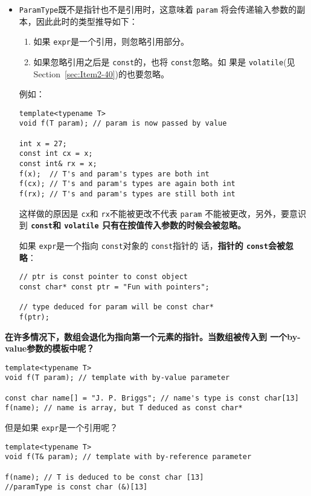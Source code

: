 \message{ !name(../CppLearning.tex)}\documentclass[a4paper,twoside]{article}
\theoremstyle{definition}
\theoremstyle{remark}
\numberwithin{equation}{section}
\let\OldTexttt\texttt
\renewcommand{\texttt}[1]{{\color{blue} \OldTexttt{#1}}}
\begin{document}
\begin{itemize}
\item \texttt{ParamType}既不是指针也不是引用时，这意味着\texttt{param}
  将会传递输入参数的副本，因此此时的类型推导如下：
  \begin{enumerate}
  \item 如果\texttt{expr}是一个引用，则忽略引用部分。
  \item 如果忽略引用之后是\texttt{const}的，也将\texttt{const}忽略。如
    果是\texttt{volatile}(见Section~\ref{sec:Item2-40})的也要忽略。
  \end{enumerate}
  例如：
\begin{verbatim}
template<typename T>
void f(T param); // param is now passed by value

int x = 27;       
const int cx = x; 
const int& rx = x; 
f(x);  // T's and param's types are both int
f(cx); // T's and param's types are again both int
f(rx); // T's and param's types are still both int
\end{verbatim}
  这样做的原因是\texttt{cx}和\texttt{rx}不能被更改不代表\texttt{param}
  不能被更改，另外，要意识到\textbf{\texttt{const}和\texttt{volatile}
    只有在按值传入参数的时候会被忽略。}

  如果\texttt{expr}是一个指向\texttt{const}对象的\texttt{const}指针的
  话，\textbf{指针的\texttt{const}会被忽略}：
\begin{verbatim}
// ptr is const pointer to const object
const char* const ptr = "Fun with pointers";

// type deduced for param will be const char*
f(ptr);
\end{verbatim}
\end{itemize}

\textbf{在许多情况下，数组会退化为指向第一个元素的指针。当数组被传入到
  一个by-value参数的模板中呢？}

\begin{verbatim}
template<typename T>
void f(T param); // template with by-value parameter

const char name[] = "J. P. Briggs"; // name's type is const char[13]
f(name); // name is array, but T deduced as const char*
\end{verbatim}

但是如果\texttt{expr}是一个引用呢？

\begin{verbatim}
template<typename T>
void f(T& param); // template with by-reference parameter

f(name); // T is deduced to be const char [13]
//paramType is const char (&)[13]
\end{verbatim}
\end{document}
